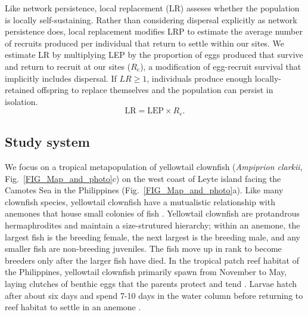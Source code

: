 \documentclass[12pt, oneside]{article}   	%
\begin{document}
Like network persistence, local replacement (LR) asseses whether the population is locally self-sustaining. Rather than considering dispersal explicitly as network persistence does, local replacement modifies LRP to estimate the average number of recruits produced per individual that return to settle within our sites. We estimate LR by multiplying LEP by the proportion of eggs produced that survive and return to recruit at our sites ($R_e$), a modification of egg-recruit survival that implicitly includes dispersal. If $LR \geq 1$, individuals produce enough locally-retained offspring to replace themselves and the population can persist in isolation. %
\begin{equation}
\text{LR} = \text{LEP} \times R_e. \label{EQN_LR}
\end{equation}

\subsection*{Study system}

We focus on a tropical metapopulation of yellowtail clownfish (\textit{Ampiprion clarkii}, Fig.\ \ref{FIG_Map_and_photo}c) on the west coast of Leyte island facing the Camotes Sea in the Philippines (Fig.\ \ref{FIG_Map_and_photo}a). Like many clownfish species, yellowtail clownfish have a mutualistic relationship with anemones that house small colonies of fish \citep{buston2003social, fautin1992field}. Yellowtail clownfish are protandrous hermaphrodites and maintain a size-strutured hierarchy; within an anemone, the largest fish is the breeding female, the next largest is the breeding male, and any smaller fish are non-breeding juveniles. The fish move up in rank to become breeders only after the larger fish have died. In the tropical patch reef habitat of the Philippines, yellowtail clownfish primarily spawn from November to May, laying clutches of benthic eggs that the parents protect and tend \citep{ochi1989mating, holtswarth2017fecundity}. Larvae hatch after about six days and spend 7-10 days in the water column before returning to reef habitat to settle in an anemone \citep{fautin1992field}.

\end{document}
